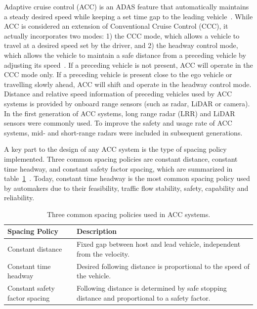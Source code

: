 \documentclass{article}
\begin{document}
Adaptive cruise control (ACC) is an ADAS feature that automatically maintains a steady desired speed while keeping a set time gap to the leading vehicle~\cite{Lingyun2010}. While ACC is considered an extension of Conventional Cruise Control (CCC), it actually incorporates two modes: 1) the CCC mode, which allows a vehicle to travel at a desired speed set by the driver, and 2) the headway control mode, which allows the vehicle to maintain a safe distance from a preceding vehicle by adjusting its speed~\cite{Lingyun2010}. If a preceding vehicle is not present, ACC will operate in the CCC mode only. If a preceding vehicle is present close to the ego vehicle or travelling slowly ahead, ACC will shift and operate in the headway control mode. Distance and relative speed information of preceding vehicles used by ACC systems is provided by onboard range sensors (such as radar, LiDAR or camera). In the first generation of ACC systems, long range radar (LRR) and LiDAR sensors were commonly used. To improve the safety and usage rate of ACC systems, mid- and short-range radars were included in subsequent generations. 


A key part to the design of any ACC system is the type of spacing policy implemented. Three common spacing policies are constant distance, constant time headway, and constant safety factor spacing, which are summarized in table~\ref{tab:spacingpolicy}~\cite{Wu2020}. Today, constant time headway is the most common spacing policy used by automakers due to their  feasibility, traffic flow stability, safety, capability and reliability.

\begin{table}[htbp]
\caption{Three common spacing policies used in ACC systems.}
\begin{center}
\begin{tabular}{|l|p{2.5in}|}
\hline
\textbf{Spacing Policy} & \textbf{Description} \\
\hline
Constant distance & Fixed gap between host and lead vehicle, independent from the velocity. \\
\hline
Constant time headway & Desired following distance is proportional to the speed of the vehicle. \\
\hline
Constant safety factor spacing & Following distance is determined by safe stopping distance and proportional to a safety factor. \\
\hline
\end{tabular}
\end{center}
\label{tab:spacingpolicy}
\end{table}
\end{document}
